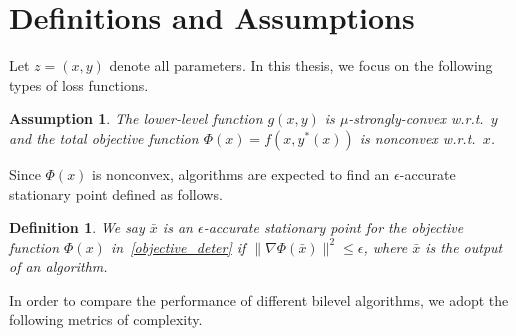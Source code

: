 \documentclass{osudissert96}
\newtheorem{assum}{Assumption}
\newtheorem{definition}{Definition}
\begin{document}
\section{Definitions and Assumptions}
Let $z=(x,y)$ denote all parameters. In this thesis, we focus on the following types of loss functions.%
\begin{assum}\label{assum:geo}
The lower-level function $g(x,y)$ is $\mu$-strongly-convex w.r.t.~$y$ and the total objective function $\Phi(x)=f(x,y^*(x))$ is nonconvex w.r.t.~$x$.  %
\vspace{-0.2cm} 
\end{assum}
Since $\Phi(x)$ is nonconvex, algorithms are expected to find an $\epsilon$-accurate stationary point defined as follows. 
\begin{definition}
We say $\bar x$ is an $\epsilon$-accurate stationary point for the objective function $\Phi(x)$ in~\cref{objective_deter} if $\|\nabla \Phi(\bar x)\|^2\leq \epsilon$, where $\bar x$ is the output of an algorithm.
\end{definition}
In order to compare the performance of different bilevel algorithms, we adopt the following metrics of  complexity. 
\end{document}
